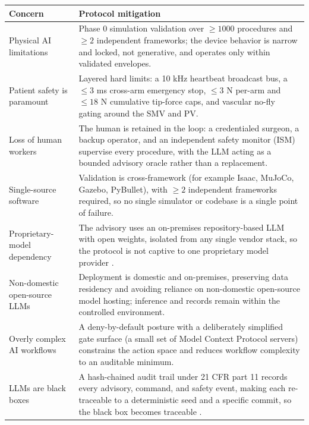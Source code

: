 \noindent\begin{tabularx}{\textwidth}{L{5.0cm} Y}
\toprule
\textbf{Concern} & \textbf{Protocol mitigation} \\
\midrule
Physical AI limitations & Phase 0 simulation validation over $\geq 1000$ procedures and $\geq 2$ independent frameworks; the device behavior is narrow and locked, not generative, and operates only within validated envelopes. \\
Patient safety is paramount & Layered hard limits: a 10 kHz heartbeat broadcast bus, a $\leq 3$ ms cross-arm emergency stop, $\leq 3$ N per-arm and $\leq 18$ N cumulative tip-force caps, and vascular no-fly gating around the SMV and PV. \\
Loss of human workers & The human is retained in the loop: a credentialed surgeon, a backup operator, and an independent safety monitor (ISM) supervise every procedure, with the LLM acting as a bounded advisory oracle rather than a replacement. \\
Single-source software & Validation is cross-framework (for example Isaac, MuJoCo, Gazebo, PyBullet), with $\geq 2$ independent frameworks required, so no single simulator or codebase is a single point of failure. \\
Proprietary-model dependency & The advisory uses an on-premises repository-based LLM with open weights, isolated from any single vendor stack, so the protocol is not captive to one proprietary model provider \cite{kawchak2025codegen16}. \\
Non-domestic open-source LLMs & Deployment is domestic and on-premises, preserving data residency and avoiding reliance on non-domestic open-source model hosting; inference and records remain within the controlled environment. \\
Overly complex AI workflows & A deny-by-default posture with a deliberately simplified gate surface (a small set of Model Context Protocol servers) constrains the action space and reduces workflow complexity to an auditable minimum. \\
LLMs are black boxes & A hash-chained audit trail under 21 CFR part 11 records every advisory, command, and safety event, making each re-traceable to a deterministic seed and a specific commit, so the black box becomes traceable \cite{kawchak2026adapt312}. \\
\bottomrule
\end{tabularx}

